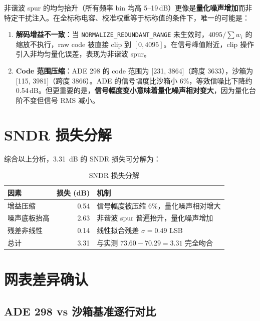\documentclass[12pt,a4paper]{article}
\begin{document}
非谐波 spur 的均匀抬升（所有频率 bin 均高 5--19\,dB）更像是\textbf{量化噪声增加}而非特定干扰注入。在全标称电容、校准权重等于标称值的条件下，唯一的可能是：

\begin{enumerate}
\item \textbf{解码增益不一致}：当 \texttt{NORMALIZE\_REDUNDANT\_RANGE} 未生效时，$4095/\sum w_i$ 的缩放不执行，raw code 被直接 clip 到 $[0, 4095]$。在信号峰值附近，clip 操作引入非均匀量化误差，表现为非谐波 spur。

\item \textbf{Code 范围压缩}：ADE 298 的 code 范围为 [231, 3864]（跨度 3633），沙箱为 [115, 3981]（跨度 3866）。ADE 的信号幅度比沙箱小 6\%，等效信噪比下降约 0.54\,dB。但更重要的是，\textbf{信号幅度变小意味着量化噪声相对变大}，因为量化台阶不变但信号 RMS 减小。
\end{enumerate}

\section{SNDR 损失分解}

综合以上分析，\SI{3.31}{dB} 的 SNDR 损失可分解为：

\begin{table}[H]
\centering
\caption{SNDR 损失分解}
\label{tab:loss_breakdown}
\begin{tabular}{lrl}
\toprule
因素 & 损失 (dB) & 机制 \\
\midrule
增益压缩 & 0.54 & 信号幅度被压缩 6\%，量化噪声相对增大 \\
噪声底板抬高 & 2.63 & 非谐波 spur 普遍抬升，量化噪声增加 \\
残差非线性 & 0.14 & 线性拟合残差 $\sigma = 0.49$ LSB \\
\midrule
总计 & 3.31 & 与实测 $73.60 - 70.29 = 3.31$ 完全吻合 \\
\bottomrule
\end{tabular}
\end{table}

\section{网表差异确认}

\subsection{ADE 298 vs 沙箱基准逐行对比}
\end{document}
